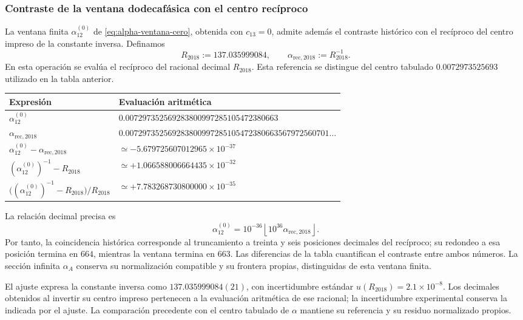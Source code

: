\subsubsection{Contraste de la ventana dodecafásica con el centro recíproco}
\label{sec:contraste-ventana-reciproco}

La ventana finita \(\alpha_{12}^{(0)}\) de
\eqref{eq:alpha-ventana-cero}, obtenida con \(c_{13}=0\), admite además
el contraste histórico con el recíproco del centro impreso de la
constante inversa. Definamos
\[
 R_{2018}:=137.035999084,\qquad
 \alpha_{\mathrm{rec},2018}:=R_{2018}^{-1}.
\]
En esta operación se evalúa el recíproco del racional decimal
\(R_{2018}\). Esta referencia se distingue del centro tabulado
\(0.0072973525693\) utilizado en la tabla anterior.

\begin{center}
\begin{tabular}{@{}ll@{}}
\toprule
Expresión & Evaluación aritmética\\
\midrule
\(\alpha_{12}^{(0)}\) &
\(0.007297352569283800997285105472380663\)\\
\(\alpha_{\mathrm{rec},2018}\) &
\(0.007297352569283800997285105472380663567972560701\ldots\)\\
\(\alpha_{12}^{(0)}-\alpha_{\mathrm{rec},2018}\) &
\(\simeq-5.679725607012965\times10^{-37}\)\\
\((\alpha_{12}^{(0)})^{-1}-R_{2018}\) &
\(\simeq+1.066588006664435\times10^{-32}\)\\
\(\bigl((\alpha_{12}^{(0)})^{-1}-R_{2018}\bigr)/R_{2018}\) &
\(\simeq+7.783268730800000\times10^{-35}\)\\
\bottomrule
\end{tabular}
\end{center}

La relación decimal precisa es
\[
 \alpha_{12}^{(0)}
 =10^{-36}\left\lfloor10^{36}\alpha_{\mathrm{rec},2018}\right\rfloor.
\]
Por tanto, la coincidencia histórica corresponde al truncamiento a
treinta y seis posiciones decimales del recíproco; su redondeo a esa
posición termina en \(664\), mientras la ventana termina en \(663\).
Las diferencias de la tabla cuantifican el contraste entre ambos
números. La sección infinita \(\alpha_A\) conserva su normalización
compatible y su frontera propias, distinguidas de esta ventana finita.

El ajuste expresa la constante inversa como
\(137.035999084(21)\), con incertidumbre estándar
\(u(R_{2018})=2.1\times10^{-8}\)\cite{codata2018}.
Los decimales obtenidos al invertir su centro impreso pertenecen a la
evaluación aritmética de ese racional; la incertidumbre experimental
conserva la indicada por el ajuste. La comparación precedente con el
centro tabulado de \(\alpha\) mantiene su referencia y su residuo
normalizado propios.
